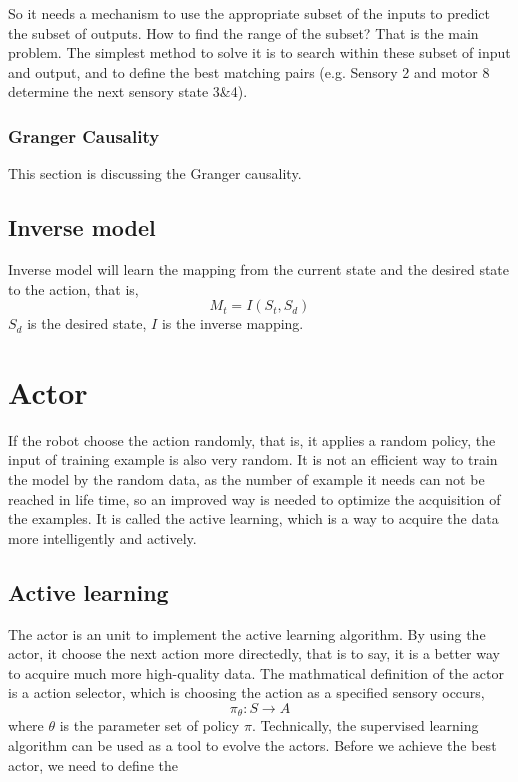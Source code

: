 \documentclass{article}
\begin{document}
So it needs a mechanism to use the appropriate subset of the inputs to predict the subset of outputs. How to find the range of the subset? That is the main problem. The simplest method to solve it is to search within these subset of input and output, and to define the best matching pairs (e.g. Sensory 2 and motor 8 determine the next sensory state 3\&4).

\subsubsection{Granger Causality}
\label{sec:grangercausality}

This section is discussing the Granger causality.


\subsection{Inverse model}
\label{sec:inversemodel}


Inverse model will learn the mapping from the current state and the desired state to the action, that is, 
\begin{equation}
  \label{eq:reversemodel}
  M_t = I(S_t,S_d)
\end{equation}
$S_d$ is the desired state, $I$ is the inverse mapping.


\section{Actor}
\label{sec:actor}
If the robot choose the action randomly, that is, it applies a random policy, the input of training example is also very random. It is not an efficient way to train the model by the random data, as the number of example it needs can not be reached in life time, so an improved way is needed to optimize the acquisition of the examples. It is called the active learning, which is a way to acquire the data more intelligently and actively.

\subsection{Active learning}
\label{sec:activelearning}
The actor is an unit to implement the active learning algorithm. By using the actor, it choose the next action more directedly, that is to say, it is a better way to acquire much more high-quality data.
The mathmatical definition of the actor is a action selector, which is choosing the action as a specified sensory occurs,
\begin{equation}
  \label{eq:actormath}
  \pi_{\theta} : S \rightarrow A 
\end{equation}
where $\theta$ is the parameter set of policy $\pi$. Technically, the supervised learning algorithm can be used as a tool to evolve the actors. Before we achieve the best actor, we need to define the 
\end{document}
